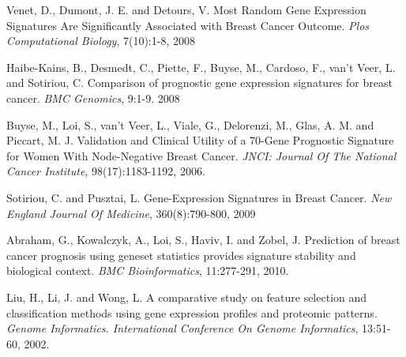 \documentclass[10.75pt]{article}
\begin{document}
\begin{thebibliography}{9}

 Venet, D., Dumont, J. E. and Detours, V. Most Random Gene Expression Signatures Are Significantly Associated with Breast Cancer Outcome. \emph{Plos Computational Biology}, 7(10):1-8, 2008

 Haibe-Kains, B., Desmedt, C., Piette, F., Buyse, M., Cardoso, F., van't Veer, L. and Sotiriou, C. Comparison of prognostic gene expression signatures for breast cancer. \emph{BMC Genomics}, 9:1-9. 2008

 Buyse, M., Loi, S., van't Veer, L., Viale, G., Delorenzi, M., Glas, A. M. and Piccart, M. J. Validation and Clinical Utility of a 70-Gene Prognostic Signature for Women With Node-Negative Breast Cancer. \emph{JNCI: Journal Of The National Cancer Institute}, 98(17):1183-1192, 2006. 

 Sotiriou, C. and Pusztai, L. Gene-Expression Signatures in Breast Cancer. \emph{New England Journal Of Medicine}, 360(8):790-800, 2009

 Abraham, G., Kowalczyk, A., Loi, S., Haviv, I. and Zobel, J. Prediction of breast cancer prognosis using geneset statistics provides signature stability and biological context. \emph{BMC Bioinformatics}, 11:277-291, 2010.

 Liu, H., Li, J. and Wong, L. A comparative study on feature selection and classification methods using gene expression profiles and proteomic patterns. \emph{Genome Informatics. International Conference On Genome Informatics}, 13:51-60, 2002.
\end{thebibliography}
\end{document}
